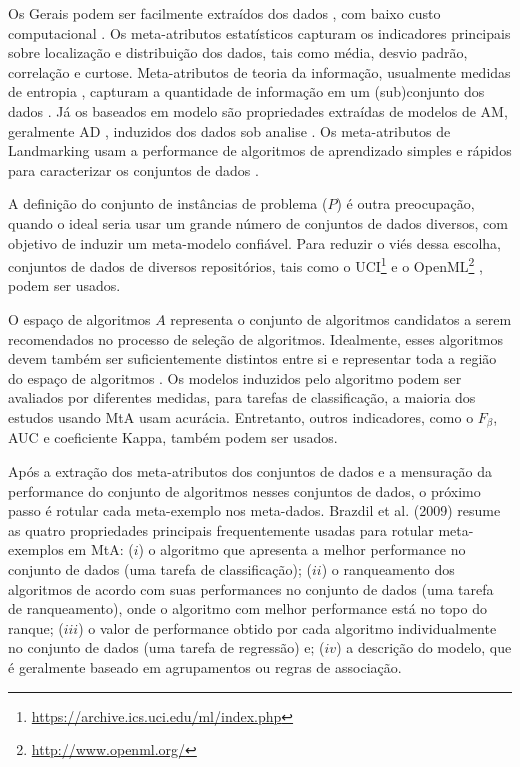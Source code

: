 Os Gerais podem ser facilmente extraídos dos dados \cite{Reif2014}, com baixo
custo computacional \cite{Reif2012}.
Os meta-atributos estatísticos capturam os indicadores principais sobre
localização e distribuição dos dados, tais como média, desvio padrão,
correlação e curtose.
Meta-atributos de teoria da informação, usualmente medidas de entropia
\cite{Segrera2008}, capturam a quantidade de informação em um (sub)conjunto dos
dados \cite{SmithMiles2008}.
Já os baseados em modelo são propriedades extraídas de modelos de AM,
geralmente AD \cite{Bensusan2000, Peng2002}, induzidos dos dados sob analise
\cite{Reif2014}.
Os meta-atributos de Landmarking usam a performance de algoritmos de
aprendizado simples e rápidos para caracterizar os conjuntos de dados
\cite{SmithMiles2008}.

A definição do conjunto de instâncias de problema ($P$) é outra preocupação,
quando o ideal seria usar um grande número de conjuntos de dados diversos, com
objetivo de induzir um meta-modelo confiável.
Para reduzir o viés dessa escolha, conjuntos de dados de diversos repositórios,
tais como o UCI\footnote{\url{https://archive.ics.uci.edu/ml/index.php}}
\cite{Lichman2013} e o OpenML\footnote{\url{http://www.openml.org/}}
\cite{OpenML2013}, podem ser usados.

O espaço de algoritmos $A$ representa o conjunto de algoritmos candidatos a
serem recomendados no processo de seleção de algoritmos.
Idealmente, esses algoritmos devem também ser suficientemente distintos entre
si e representar toda a região do espaço de algoritmos \cite{Munoz2018}.
Os modelos induzidos pelo algoritmo podem ser avaliados por diferentes medidas,
para tarefas de classificação, a maioria dos estudos usando MtA usam acurácia.
Entretanto, outros indicadores, como o $F_\beta$, AUC e coeficiente Kappa,
também podem ser usados.

Após a extração dos meta-atributos dos conjuntos de dados e a mensuração da
performance do conjunto de algoritmos nesses conjuntos de dados, o próximo
passo é rotular cada meta-exemplo nos meta-dados.
Brazdil et al. (2009) \cite{Brazdil2009} resume as quatro propriedades
principais frequentemente usadas para rotular meta-exemplos em MtA: ($i$)
o algoritmo que apresenta a melhor performance no conjunto de dados (uma tarefa
de classificação); ($ii$) o ranqueamento dos algoritmos de acordo com suas
performances no conjunto de dados (uma tarefa de ranqueamento), onde o
algoritmo com melhor performance está no topo do ranque; ($iii$) o valor de
performance obtido por cada algoritmo individualmente no conjunto de dados (uma
tarefa de regressão) e; ($iv$) a descrição do modelo, que é geralmente baseado
em agrupamentos ou regras de associação.

